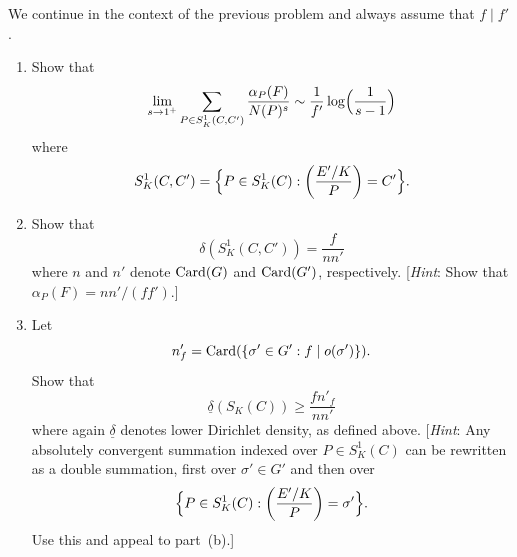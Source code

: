 \begin{exercise}[20]
  \label{ex:ch7-20}
  We continue in the context of the previous problem and always assume that
  $f \mid f'$.
  \begin{enumerate}[label=(\alph*)]
    \item Show that
      \[
        \lim_{s \to 1^+} \sum_{P \in S_K^1(C, C')} \frac{\alpha_P(F)}{N(P)^s}
        \sim \frac{1}{f'} \log\Bigl(\frac{1}{s-1}\Bigr)
      \]
      where
      \[
        S_K^1(C, C') = \Bigl\{P \in S_K^1(C) :
        \left(\frac{E'/K}{P}\right) = C'\Bigr\}.
      \]
    \item Show that
      \[
        \delta(S_K^1(C, C')) = \frac{f}{nn'}
      \]
      where $n$ and $n'$ denote $\operatorname{Card}(G)$ and
      $\operatorname{Card}(G')$, respectively. [\emph{Hint}: Show that
      $\alpha_P(F) = nn'/(ff')$.]
    \item Let
      \[
        n'_f = \operatorname{Card}(\{\sigma' \in G' : f \mid o(\sigma')\}).
      \]
      Show that
      \[
        \underline{\delta}(S_K(C)) \ge \frac{f n'_f}{nn'}
      \]
      where again $\underline{\delta}$ denotes lower Dirichlet density, as
      defined above. [\emph{Hint}: Any absolutely convergent summation
      indexed over $P \in S_K^1(C)$ can be rewritten as a double summation,
      first over $\sigma' \in G'$ and then over
      \[
        \Bigl\{P \in S_K^1(C) : \left(\frac{E'/K}{P}\right) = \sigma'\Bigr\}.
      \]
      Use this and appeal to part~(b).]
  \end{enumerate}
\end{exercise}

